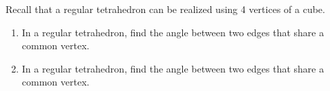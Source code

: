 Recall that a regular tetrahedron can be realized using 4 vertices of a cube. 
\begin{enumerate}
\item In a regular tetrahedron, find the angle between two edges that  share a common vertex. 
\item In a regular tetrahedron, find the angle between two edges that  share a common vertex. 
\end{enumerate}
